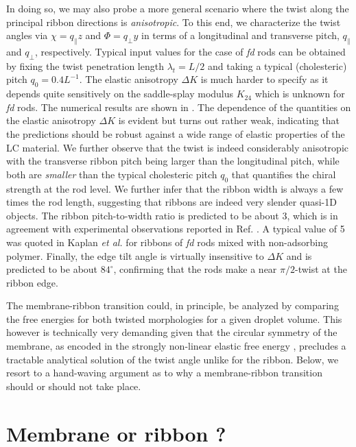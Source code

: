 In doing so, we may also probe a more general scenario where the twist along the principal ribbon directions is {\em anisotropic}. To this end, we characterize  the twist angles  via $\chi = q_{\parallel} z$ and $\Phi = q_{\perp}y$ in terms of a longitudinal and transverse pitch, $q_{\parallel}$ and $q_{\perp}$, respectively. 
 Typical input values  for the case of {\em fd} rods can be obtained by fixing the twist penetration length $\lambda_{t}  = L/2$ \cite{barry_jpcb2009} and taking a typical (cholesteric) pitch $q_{0} = 0.4L^{-1}$. The elastic anisotropy $\Delta K$ is much harder to specify as it depends quite sensitively on the  saddle-splay modulus $K_{24}$ which is unknown for {\em fd} rods. 
The numerical results are shown in . The dependence of the quantities on the elastic anisotropy $\Delta K $ is evident but turns out rather weak, indicating that the predictions should be robust against a wide range of elastic properties of the LC material.   We further observe that the twist is indeed considerably anisotropic with the transverse ribbon pitch being larger than  the longitudinal pitch, while both are {\em smaller} than the typical cholesteric pitch $q_{0}$ that quantifies the chiral strength at the rod level. We further infer that the ribbon width is always a few times the rod length, suggesting that ribbons are indeed very slender quasi-1D  objects. The ribbon pitch-to-width ratio is predicted to be about 3, which is in agreement with experimental observations reported in Ref. \cite{Gibaud2012}. A typical value of 5 was quoted in Kaplan {\em et al.} \cite{kaplan2010theory}  for ribbons of {\em fd} rods mixed with non-adsorbing polymer.   Finally, the edge tilt angle is virtually insensitive to $\Delta K$ and is predicted to be about $84 ^\circ$, confirming that the rods make a near  $\pi/2$-twist at the ribbon edge.

The membrane-ribbon transition   could, in principle, be analyzed by comparing the free energies for both twisted morphologies for a given droplet volume. This however is technically very demanding given that the circular symmetry of the membrane, as encoded in the strongly non-linear elastic free energy ,  precludes a tractable analytical solution of the twist angle unlike for the ribbon. Below, we resort to a hand-waving argument as to why a membrane-ribbon transition should or should not take place. 
 
\section{Membrane or ribbon ? }

